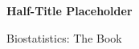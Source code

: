 \cleardoublepage
\thispagestyle{empty}
\null
\vfill
\begin{center}
{\Large\bfseries Half-Title Placeholder}

\vspace{1em}
{\large Biostatistics: The Book}
\end{center}
\vfill
\null
